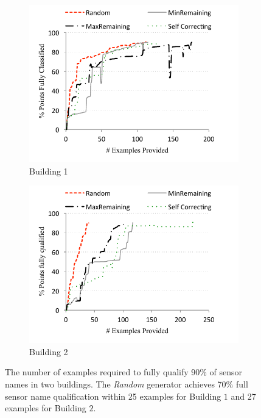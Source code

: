 \begin{figure}[h!]
\centering
	\begin{subfigure}{0.48\textwidth}
                \centering
		\includegraphics[width=\textwidth]{./figs/soda-active-learning.pdf}
                \caption{Building 1}
                \label{fig:active-learning-soda}
	\end{subfigure}
	\begin{subfigure}{0.48\textwidth}
                \centering
		\includegraphics[width=\textwidth]{./figs/sdh-active-learning.pdf}
                \caption{Building 2}
                \label{fig:active-learning-sdh}
	\end{subfigure}
\caption{The number of examples required to fully qualify 90\% of sensor names in two buildings. The {\it Random} generator achieves 70\% full sensor name qualification within 25 examples for Building $1$ and 27 examples for Building $2$.}
\label{fig:active-learning}
\end{figure}


